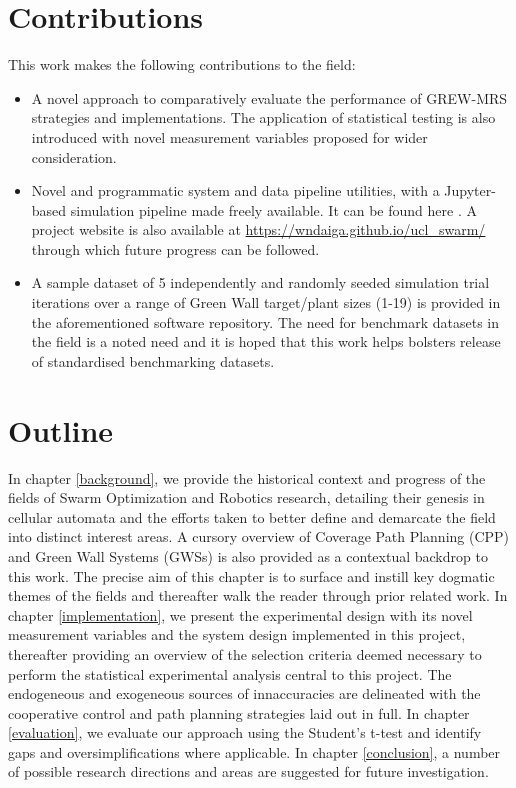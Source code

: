 \documentclass{report}
\begin{document}
\section{Contributions}
This work makes the following contributions to the field:

\begin{itemize}
	\item A novel approach to comparatively evaluate the performance of GREW-MRS strategies and implementations. The application of statistical testing is also introduced with novel measurement variables proposed for wider consideration.
	\item Novel and programmatic system and data pipeline utilities, with a Jupyter-based \cite{Jupyter} simulation pipeline made freely available. It can be found here \cite{SWARMCODE}. A project website is also available at \url{https://wndaiga.github.io/ucl_swarm/} through which future progress can be followed.
	\item A sample dataset of 5 independently and randomly seeded simulation trial iterations over a range of Green Wall target/plant sizes (1-19) is provided in the aforementioned software repository. The need for benchmark datasets in the field is a noted need and it is hoped that this work helps bolsters release of standardised benchmarking datasets.
\end{itemize}

\section{Outline}

In chapter \ref{background}, we provide the historical context and progress of the fields of Swarm Optimization and Robotics research, detailing their genesis in cellular automata and the efforts taken to better define and demarcate the field into distinct interest areas. A cursory overview of Coverage Path Planning (CPP) and Green Wall Systems (GWSs) is also provided as a contextual backdrop to this work. The precise aim of this chapter is to surface and instill key dogmatic themes of the fields and thereafter walk the reader through prior related work.  In chapter \ref{implementation}, we present the experimental design with its novel measurement variables and the system design implemented in this project, thereafter providing an overview of the selection criteria deemed necessary to perform the statistical experimental analysis central to this project. The endogeneous and exogeneous sources of innaccuracies are delineated with the cooperative control and path planning strategies laid out in full. In chapter \ref{evaluation}, we evaluate our approach using the Student's t-test \cite{Kennedy1995} and identify gaps and oversimplifications where applicable. In chapter \ref{conclusion}, a number of possible research directions and areas are suggested for future investigation.
\end{document}
